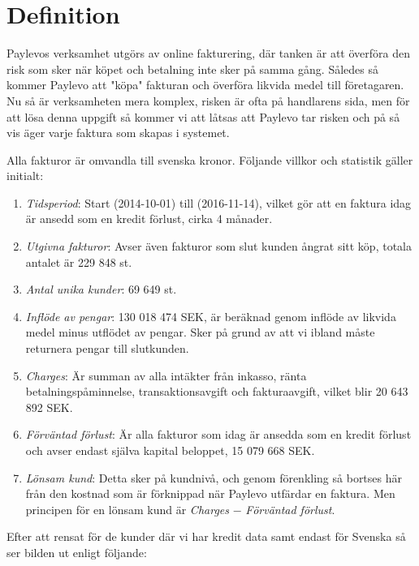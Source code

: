 \documentclass[swedish, english, 11pt ]{article}
\numberwithin{equation}{section}
\begin{document}
\section{Definition} 
\label{sec:1} 
Paylevos verksamhet utgörs av online fakturering, där tanken är att överföra den risk som sker när köpet och 
betalning inte sker på samma gång. Således så kommer Paylevo att "köpa" fakturan och överföra likvida 
medel till företagaren.  Nu så är verksamheten mera komplex, risken är ofta på handlarens sida, men för att 
lösa denna uppgift så kommer vi att låtsas att Paylevo tar risken och på så vis äger varje faktura som skapas 
i systemet.  

Alla fakturor är omvandla till svenska kronor. Följande villkor och statistik gäller initialt:

\begin{enumerate}[label=\emph{\arabic*})]
	\item \textit{Tidsperiod}:  Start (2014-10-01) till  (2016-11-14), vilket gör 
		att en faktura idag är ansedd som en kredit förlust, cirka 4 månader.
	\item \textit{Utgivna fakturor}: Avser även fakturor som slut kunden  ångrat sitt köp, totala antalet är 229 848 st.
	\item \textit{Antal unika kunder}:  69 649 st.
	\item \textit{Inflöde av pengar}:  130 018 474 SEK, är beräknad genom inflöde av likvida medel minus utflödet av pengar. 
		Sker på grund av att vi ibland måste returnera pengar till slutkunden. 
	\item \textit{Charges}: Är summan av alla intäkter från inkasso, ränta betalningspåminnelse, transaktionsavgift och fakturaavgift, vilket blir 20 643 892  SEK.
	\item \textit{Förväntad förlust}: Är alla fakturor som idag är ansedda som en kredit förlust och avser endast själva kapital beloppet,  15 079 668  SEK.
	\item \textit{Lönsam kund}: Detta sker på kundnivå, och genom förenkling så bortses här från den kostnad som är förknippad när Paylevo utfärdar en faktura. Men principen för en 
		lönsam kund är \textit{Charges} $-$ \textit{Förväntad förlust}.
\end{enumerate}

Efter att rensat för de kunder där vi har kredit data samt endast för Svenska så ser bilden ut enligt följande:
\end{document}
